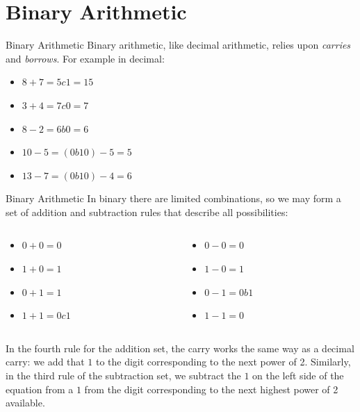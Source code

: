 \documentclass{beamer}
\begin{document}
\section{Binary Arithmetic}

\begin{frame}{Binary Arithmetic}
Binary arithmetic, like decimal arithmetic, relies upon \textit{carries} and \textit{borrows}.  For example in decimal: \\ \vspace{0.5cm}
\begin{itemize}
\item $8+7 = 5 c 1 = 15$
\item $3+4 = 7 c 0 = 7$
\item $8-2 = 6 b 0 = 6$
\item $10-5 = (0 b 10) - 5 = 5$
\item $13-7 = (0 b 10) - 4 = 6$ 
\end{itemize}
\end{frame}

\begin{frame}{Binary Arithmetic}
In binary there are limited combinations, so we may form a set of addition and subtraction rules that describe all possibilities: \\ \vspace{0.5cm}
\hrulefill
\begin{columns}[T]
\begin{column}{0.5\textwidth}
\begin{itemize}
\item $0+0=0$
\item $1+0=1$
\item $0+1=1$
\item $1+1 = 0 c 1$
\end{itemize}
\end{column}
\begin{column}{0.5\textwidth}
\begin{itemize}
\item $0-0=0$
\item $1-0=1$
\item $0-1=0b1$
\item $1-1 = 0$
\end{itemize}
\end{column}
\end{columns}
\tiny
In the fourth rule for the addition set, the carry works the same way as a decimal carry: we add that $1$ to the digit corresponding to the next power of 2.  Similarly, in the third rule of the subtraction set, we subtract the $1$ on the left side of the equation from a $1$ from the digit corresponding to the next highest power of 2 available.
\end{frame}
\end{document}
